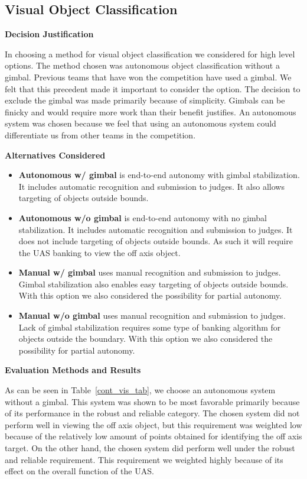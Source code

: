 \subsection{Visual Object Classification}

\textbf{Decision Justification}

In choosing a method for visual object classification we considered for high level options. The method chosen was autonomous object classification without a gimbal. Previous teams that have won the competition have used a gimbal. We felt that this precedent made it important to consider the option. The decision to exclude the gimbal was made primarily because of simplicity. Gimbals can be finicky and would require more work than their benefit justifies. An autonomous system was chosen because we feel that using an autonomous system could differentiate us from other teams in the competition.

\textbf{Alternatives Considered}
\begin{itemize}
\item \textbf{Autonomous w/ gimbal} is end-to-end autonomy with gimbal stabilization. It includes automatic recognition and submission to judges. It also allows targeting of objects outside bounds.
\item \textbf{Autonomous w/o gimbal} is end-to-end autonomy with no gimbal stabilization. It includes automatic recognition and submission to judges. It does not include targeting of objects outside bounds. As such it will require the UAS banking to view the off axis object.
\item \textbf{Manual w/ gimbal} uses manual recognition and submission to judges. Gimbal stabilization also enables easy targeting of objects outside bounds. With this option we also considered the possibility for partial autonomy.
\item \textbf{Manual w/o gimbal} uses manual recognition and submission to judges. Lack of gimbal stabilization requires some type of banking algorithm for objects outside the boundary. With this option we also considered the possibility for partial autonomy.
\end{itemize}

\textbf{Evaluation Methods and Results}

As can be seen in Table~\ref{cont_vis_tab}, we choose an autonomous system without a gimbal. This system was shown to be most favorable primarily because of its performance in the robust and reliable category. The chosen system did not perform well in viewing the off axis object, but this requirement was weighted low because of the relatively low amount of points obtained for identifying the off axis target. On the other hand, the chosen system did perform well under the robust and reliable requirement. This requirement we weighted highly because of its effect on the overall function of the UAS.

